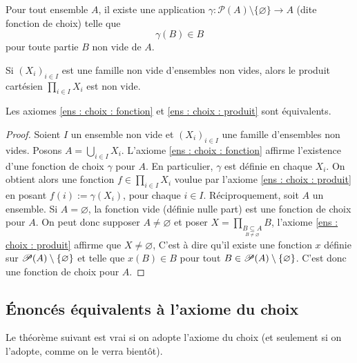 \begin{axiome}[du choix]\label{ens : choix : fonction}
	Pour tout ensemble $A$, il existe une application $\gamma: \mathcal{P}(A)\setminus\{\varnothing\}\to A$ (dite fonction de choix) telle que
	\begin{equation*}
		\gamma(B)\in B
	\end{equation*}
	pour toute partie $B$ non vide de $A$.
\end{axiome}

\begin{axiome}\label{ens : choix : produit}
	Si $(X_i)_{i\in I}$ est une famille non vide d'ensembles non vides, alors le produit cartésien $\prod_{i\in I}X_i$ est non vide.
\end{axiome}

\begin{theoreme}\label{ens : choix : équivalence fonction-produit}
	Les axiomes \ref{ens : choix : fonction} et \ref{ens : choix : produit} sont équivalents.
\end{theoreme}

\begin{proof}
	Soient $I$ un ensemble non vide et $(X_i)_{i\in I}$ une famille d'ensembles non vides. Posons $A = \bigcup_{i \in I} X_i$. L'axiome \ref{ens : choix : fonction} affirme l'existence d'une fonction de choix $\gamma$ pour $A$. En particulier, $\gamma$ est définie en chaque $X_i$. On obtient alors une fonction $f\in\prod_{i\in I}X_i$ voulue par l'axiome \ref{ens : choix : produit} en posant $f(i) := \gamma(X_i)$, pour chaque $i \in I$.
	Réciproquement, soit $A$ un ensemble. Si $A=\varnothing$, la fonction vide (définie nulle part) est une fonction de choix pour $A$. On peut donc supposer $A\neq \varnothing$ et poser
	$X=\prod_{\underset{B\neq \varnothing}{B\subseteq A}}B$, l'axiome \ref{ens : choix : produit} affirme que $X\neq \varnothing$,
	C'est à dire  qu'il existe une fonction $x$ définie sur $\mathscr{P}(A)\setminus \{\varnothing\}$ et telle que $x(B)\in B$ pour tout $B\in \mathscr{P}(A)\setminus\{\varnothing\}$. C'est donc une
	fonction de choix pour $A$.
\end{proof}

\subsection{Énoncés équivalents à l'axiome du choix}

Le théorème suivant est vrai si on adopte l'axiome du choix (et seulement si on l'adopte, comme on le verra bientôt).

